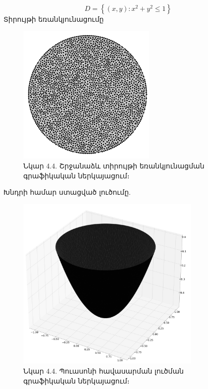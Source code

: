 \documentclass[fleqn, bachelor,subf,12pt,notitlepage]{article}
\begin{document}
$$ D = \left\{\left(x,y\right): x^{2}+y^{2} \leq 1\right\}$$
Տիրույթի եռանկյունացումը
\begin{figure}[H]
\centering
\includegraphics[width=0.6\textwidth]{images/circle_mesh}
\captionsetup{labelformat=empty}
\caption{Նկար 4.4. Շրջանաձև տիրույթի եռանկյունացման գրաֆիկական ներկայացում։}
\end{figure}
Խնդրի համար ստացված լուծումը.
\begin{figure}[H]
\centering
\includegraphics[width=0.8\textwidth]{images/poisson_equation_on_unit_circle_solution}
\captionsetup{labelformat=empty}
\caption{Նկար 4.4. Պուասոնի հավասարման լուծման գրաֆիկական ներկայացում։}
\end{figure}
\newpage
\end{document}
